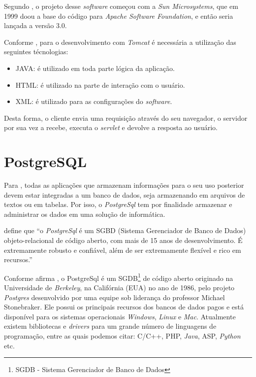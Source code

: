 	\par Segundo , o projeto desse \textit{software}
começou com a \textit{Sun Microsystems}, que em 1999 doou a base do código para
\textit{Apache Software Foundation}, e então seria lançada a versão 3.0.

	\par Conforme , para o desenvolvimento com
	\textit{Tomcat} é necessária a utilização das seguintes técnologias:
	
	\begin{itemize}
	  
	  \item JAVA: é utilizado em toda parte lógica da aplicação.
	  
	  \item HTML: é utilizado na parte de interação com o usuário.
	  
	  \item XML: é utilizado para as configurações do \textit{software}. 
	
	\end{itemize}
 
 
 
	\par Desta forma, o cliente envia uma requisição através do seu navegador, o
servidor por sua vez a recebe, executa o \textit{servlet} e devolve a resposta
ao usuário.

\section{PostgreSQL}

	\par Para , todas as aplicações que armazenam
informações para o seu uso posterior devem estar integradas a um banco de
dados, seja armazenando em arquivos de textos ou em tabelas. Por isso, o
\textit{PostgreSql} tem por finalidade armazenar e administrar os dados em uma
solução de informática.
	
	\par {} define que “o \textit{PostgreSql} é
um SGBD (Sistema Gerenciador de Banco de Dados) objeto-relacional de código
aberto, com mais de 15 anos de desenvolvimento. É extremamente robusto e
confiável, além de ser extremamente flexível e rico em recursos.” 

	\par Conforme afirma , o PostgreSql é um
SGDB\footnote{SGDB - Sistema Gerenciador de Banco de Dados } de código aberto
originado na Universidade de \textit{Berkeley}, na Califórnia (EUA) no ano de
1986, pelo projeto \textit{Postgres} desenvolvido por uma equipe sob liderança
do professor Michael Stonebraker. Ele possui os principais recursos dos bancos
de dados pagos e está disponível para os sistemas operacionais
\textit{Windows}, \textit{Linux} e \textit{Mac}. Atualmente existem bibliotecas
e \textit{drivers} para um grande número de linguagens de programação, entre as
quais podemos citar: C/C++, PHP, \textit{Java}, ASP, \textit{Python} etc.

